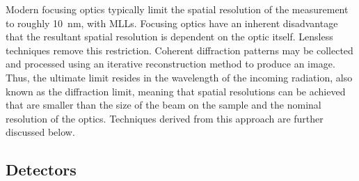 \documentclass[journal=cmatex,manuscript=perspective]{achemso}
\begin{document}
Modern focusing optics typically limit the spatial resolution of the
measurement to roughly \SI{10}{nm}, with MLLs\cite{yan2014}. Focusing
optics have an inherent disadvantage that the resultant spatial
resolution is dependent on the optic itself. Lensless techniques
remove this restriction. Coherent diffraction patterns may be
collected and processed using an iterative reconstruction method to
produce an image. Thus, the ultimate limit resides in the wavelength
of the incoming radiation, also known as the diffraction limit,
meaning that spatial resolutions can be achieved that are smaller than
the size of the beam on the sample and the nominal resolution of the
optics. Techniques derived from this approach are further discussed
below.

\subsection{Detectors}
\end{document}
